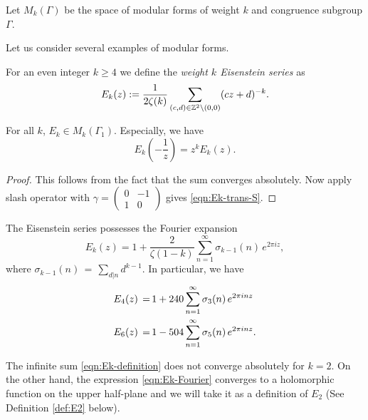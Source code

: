\begin{definition}\label{def:Mk}\leanok
    Let $M_k(\Gamma)$ be the space of modular forms of weight $k$ and congruence subgroup $\Gamma$.
\end{definition}


Let us consider several examples of modular forms.
\begin{definition}\label{def:Ek}%
For an even integer $k\geq 4$ we define the \emph{weight $k$ Eisenstein series} as
\begin{equation}\label{eqn:Ek-definition}
E_k(z):=\frac{1}{2\zeta(k)}\sum_{(c,d)\in\mathbb{Z}^2\backslash(0,0)}(cz+d)^{-k}.\end{equation}
\end{definition}
\begin{lemma}\label{lemma:Ek-is-modular-form}
For all $k$, $E_k\in M_k(\Gamma_1)$.
Especially, we have
\begin{equation}\label{eqn:Ek-trans-S}
    E_k \left(-\frac{1}{z}\right) = z^k E_k(z).
\end{equation}
\end{lemma}
\begin{proof}
This follows from the fact that the sum converges absolutely.
Now apply slash operator with $\gamma = \left(\begin{smallmatrix} 0 & -1 \\ 1 & 0 \end{smallmatrix}\right)$ gives \eqref{eqn:Ek-trans-S}.
\end{proof}

\begin{lemma}\label{lemma:Ek-Fourier}
The Eisenstein series possesses the Fourier expansion
\begin{equation}\label{eqn:Ek-Fourier}E_k(z)=1+\frac{2}{\zeta(1-k)}\sum_{n=1}^\infty \sigma_{k-1}(n)\,e^{2\pi i z}, \end{equation}
where $\sigma_{k-1}(n)\,=\,\sum_{d|n} d^{k-1}$. In particular, we have
\begin{align}
  E_4(z)\,=\,& 1+240\sum_{n=1}^\infty \sigma_3(n)\,e^{2\pi i n z} \notag \\
  E_6(z)\,=\,& 1-504\sum_{n=1}^\infty \sigma_5(n)\,e^{2\pi i n z}. \notag
\end{align}
\end{lemma}
The infinite sum \eqref{eqn:Ek-definition} does not converge absolutely for $k=2$.
On the other hand, the expression \eqref{eqn:Ek-Fourier} converges to a holomorphic function on the upper half-plane and we will take it as a definition of $E_2$ (See Definition \ref{def:E2} below).


